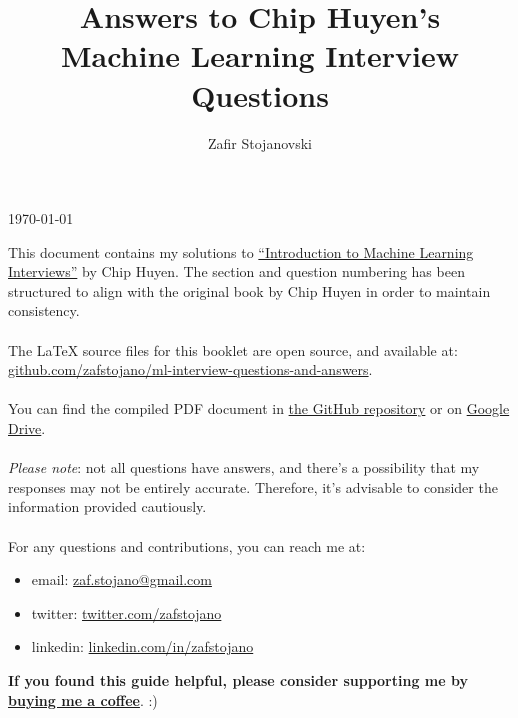 \documentclass{article}
\title{\Huge Answers to Chip Huyen's \\ Machine Learning Interview Questions}
\author{\Large Zafir Stojanovski}
\date{}
\begin{document}
\maketitle

\thispagestyle{empty} %

\vfill %
\begin{center}
\today
\end{center}

\newpage
\tableofcontents

\setcounter{section}{4}
\newpage

\noindent This document contains my solutions to \href{https://huyenchip.com/ml-interviews-book/}{``Introduction to Machine Learning Interviews''} by Chip Huyen. The section and question numbering has been structured to align with the original book by Chip Huyen in order to maintain consistency.
\\
\\
The \LaTeX \hspace{0.07em} source files for this booklet are open source, and available at: \\ \href{https://github.com/zafstojano/ml-interview-questions-and-answers}{github.com/zafstojano/ml-interview-questions-and-answers}. 
\\
\\
You can find the compiled PDF document in \href{https://github.com/zafstojano/ml-interview-questions-and-answers/blob/main/ML_interview_questions_and_answers.pdf}{the GitHub repository} or on \href{https://drive.google.com/file/d/1P4w12EvvFG19f4uVsvai6fC93p7kRphE/view}{Google Drive}.
\\
\\
\textit{Please note}: not all questions have answers, and there's a possibility that my responses may not be entirely accurate. Therefore, it's advisable to consider the information provided cautiously.
\\
\\
For any questions and contributions, you can reach me at:
\begin{itemize}
    \item email: \href{mailto:zaf.stojano@gmail.com}{zaf.stojano@gmail.com}
    \item twitter: \href{https://twitter.com/zafstojano}{twitter.com/zafstojano}
    \item linkedin: \href{https://www.linkedin.com/in/zafstojano/}{linkedin.com/in/zafstojano}
\end{itemize}
\vspace{2em}
\noindent \textbf{If you found this guide helpful, please consider supporting me by \href{https://www.buymeacoffee.com/starzmustdie}{buying me a coffee}}. :) 
\end{document}
